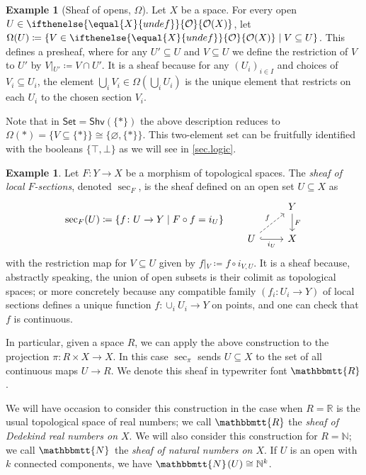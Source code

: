 \documentclass[reqno,11pt]{amsproc}
\theoremstyle{plain}
\theoremstyle{definition}
\newtheorem{example}[theorem]{Example}
\newcommand{\cat}[1]{\mathsf{#1}}
\newcommand{\Set}{\cat{Set}}
\renewcommand{\to}[1][]{\xrightarrow{#1}}
\newcommand{\internal}[1]{\raisebox{-.03ex}{$\mathbbmtt{#1}$}}
\newcommand{\nn}{\mathbb{N}}
\newcommand{\rr}{\mathbb{R}}
\newcommand{\hs}{\hspace{1pt}}
\newcommand{\tnn}{\internal{N}\hs}
\newcommand{\trr}{\internal{R}}
\newcommand{\shv}{\cat{Shv}}
\newcommand{\Op}[1][undef]{\ifthenelse{\equal{#1}{undef}}{\mathcal{O}}{\mathcal{O}(#1)}}
\newcommand{\rest}[2]{#1\big|\hspace{0in}_{#2}}
\newcommand{\true}{\top}
\newcommand{\false}{\bot}
\numberwithin{equation}{section}
\begin{document}
\begin{example}[Sheaf of opens, $\Omega$]\label{ex.subobject_classifier}
Let $X$ be a space. For every open $U\in\Op[X]$, let $\Omega(U)\coloneqq\{V\in\Op[X]\mid V\subseteq U\}$. This defines a presheaf, where for any $U'\subseteq U$ and $V\subseteq U$ we define the restriction of $V$ to $U'$ by $\rest{V}{U'}\coloneqq V\cap U'$. It is a sheaf because for any $(U_i)_{i\in I}$ and choices of $V_i\subseteq U_i$, the element $\bigcup_iV_i\in\Omega(\bigcup_i U_i)$ is the unique element that restricts on each $U_i$ to the chosen section $V_i$.

Note that in $\Set=\shv(\{*\})$ the above description reduces to $\Omega(*)=\{V\subseteq\{*\}\}\cong\{\varnothing,\{*\}\}$. This two-element set can be fruitfully identified with the booleans $\{\true,\false\}$ as we will see in \cref{sec.logic}.
\end{example}

\begin{example}\label{ex.sections}
Let $F\colon Y\to X$ be a morphism of topological spaces. The \emph{sheaf of local $F$-sections}, denoted $\sec_F$, is the sheaf defined on an open set $U\subseteq X$ as
\begin{equation}\label{eqn.sections}
\sec_F(U)\coloneqq\{f\colon U\to Y\mid F\circ f=i_U\}
\qquad
\begin{tikzcd}
	&Y\ar[d, "F"]\\
	U\ar[r, hook, "i_U"']\ar[ur, dashed, "f"]&
	X
\end{tikzcd}
\end{equation}
with the restriction map for $V\subseteq U$ given by $\rest{f}{V}\coloneqq f\circ i_{V,U}$. It is a sheaf because, abstractly speaking, the union of open subsets is their colimit as topological spaces; or more concretely because any compatible family $(f_i\colon U_i\to Y)$ of local sections defines a unique function $f\colon \cup_iU_i\to Y$ on points, and one can check that $f$ is continuous.

In particular, given a space $R$, we can apply the above construction to the projection $\pi\colon R\times X\to X$. In this case $\sec_\pi$ sends $U\subseteq X$ to the set of all continuous maps $U\to R$. We denote this sheaf in typewriter font $\internal{R}$.

We will have occasion to consider this construction in the case when $R=\rr$ is the usual topological space of real numbers; we call $\trr$ the \emph{sheaf of Dedekind real numbers on $X$}. We will also consider this construction for $R=\nn$; we call $\tnn$ the \emph{sheaf of natural numbers on $X$}. If $U$ is an open with $k$ connected components, we have $\tnn(U)\cong\nn^k$.
\end{example}
\end{document}
